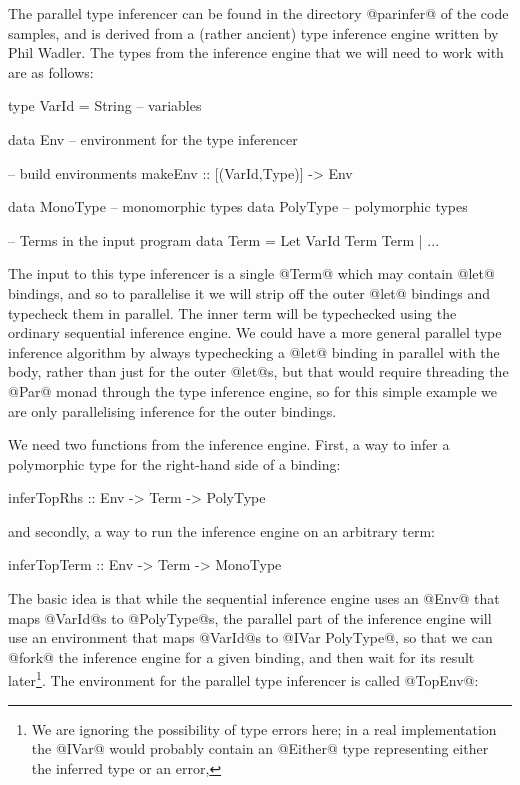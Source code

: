 The parallel type inferencer can be found in the directory @parinfer@
of the code samples, and is derived from a (rather ancient) type
inference engine written by Phil Wadler.  The types from the inference
engine that we will need to work with are as follows:

\begin{numhaskell}
type VarId = String -- variables

data Env -- environment for the type inferencer

-- build environments
makeEnv :: [(VarId,Type)] -> Env

data MonoType -- monomorphic types
data PolyType -- polymorphic types

-- Terms in the input program
data Term = Let VarId Term Term | ...
\end{numhaskell}

The input to this type inferencer is a single @Term@ which may contain
@let@ bindings, and so to parallelise it we will strip off the outer
@let@ bindings and typecheck them in parallel.  The inner term will be
typechecked using the ordinary sequential inference engine.  We could
have a more general parallel type inference algorithm by always
typechecking a @let@ binding in parallel with the body, rather than
just for the outer @let@s, but that would require threading the @Par@
monad through the type inference engine, so for this simple example we
are only parallelising inference for the outer bindings.

We need two functions from the inference engine.  First, a way to
infer a polymorphic type for the right-hand side of a binding:

\begin{haskell}
inferTopRhs :: Env -> Term -> PolyType
\end{haskell}

\noindent and secondly, a way to run the inference engine on an
arbitrary term:

\begin{haskell}
inferTopTerm :: Env -> Term -> MonoType
\end{haskell}

The basic idea is that while the sequential inference engine uses an
@Env@ that maps @VarId@s to @PolyType@s, the parallel part of the
inference engine will use an environment that maps @VarId@s to
@IVar PolyType@, so that we can @fork@ the inference engine for a
given binding, and then wait for its result later\footnote{We are
  ignoring the possibility of type errors here; in a real
  implementation the @IVar@ would probably contain an @Either@ type
  representing either the inferred type or an error,}.  The environment
for the parallel type inferencer is called @TopEnv@:

